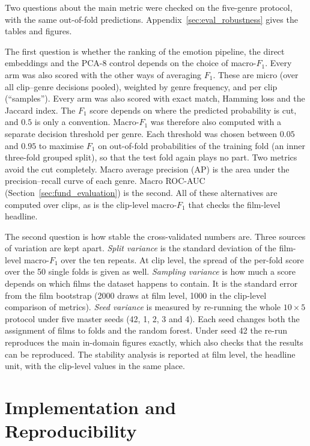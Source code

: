 Two questions about the main metric were checked on the five-genre protocol, with the same out-of-fold predictions. Appendix~\ref{sec:eval_robustness} gives the tables and figures.

The first question is whether the ranking of the emotion pipeline, the direct embeddings and the PCA-8 control depends on the choice of macro-$F_1$. Every arm was also scored with the other ways of averaging $F_1$. These are micro (over all clip--genre decisions pooled), weighted by genre frequency, and per clip (``samples''). Every arm was also scored with exact match, Hamming loss and the Jaccard index. The $F_1$ score depends on where the predicted probability is cut, and $0.5$ is only a convention. Macro-$F_1$ was therefore also computed with a separate decision threshold per genre. Each threshold was chosen between $0.05$ and $0.95$ to maximise $F_1$ on out-of-fold probabilities of the training fold (an inner three-fold grouped split), so that the test fold again plays no part. Two metrics avoid the cut completely. Macro average precision (AP) is the area under the precision--recall curve of each genre. Macro ROC-AUC (Section~\ref{sec:fund_evaluation}) is the second. All of these alternatives are computed over clips, as is the clip-level macro-$F_1$ that checks the film-level headline.

The second question is how stable the cross-validated numbers are. Three sources of variation are kept apart. \emph{Split variance} is the standard deviation of the film-level macro-$F_1$ over the ten repeats. At clip level, the spread of the per-fold score over the 50 single folds is given as well. \emph{Sampling variance} is how much a score depends on which films the dataset happens to contain. It is the standard error from the film bootstrap (2000 draws at film level, 1000 in the clip-level comparison of metrics). \emph{Seed variance} is measured by re-running the whole $10\times5$ protocol under five master seeds (42, 1, 2, 3 and 4). Each seed changes both the assignment of films to folds and the random forest. Under seed 42 the re-run reproduces the main in-domain figures exactly, which also checks that the results can be reproduced. The stability analysis is reported at film level, the headline unit, with the clip-level values in the same place.

\section{Implementation and Reproducibility}
\label{sec:methods_implementation}

